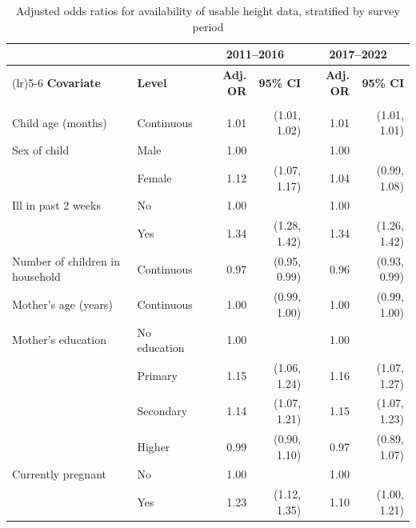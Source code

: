 \begin{table}[htbp]
\centering
\caption{Adjusted odds ratios for availability of usable height data, stratified by survey period}
\label{tab:time_stratified}
\begin{threeparttable}

\small
\renewcommand{\arraystretch}{1.15}
\setlength{\tabcolsep}{6pt}

\begin{tabularx}{\textwidth}{>{\raggedright\arraybackslash}Xlrrrr}
\toprule
& & \multicolumn{2}{c}{\textbf{2011--2016}} & \multicolumn{2}{c}{\textbf{2017--2022}} \\
\cmidrule(lr){3-4}\cmidrule(lr){5-6}
\textbf{Covariate} & \textbf{Level} &
\textbf{Adj. OR} & \textbf{95\% CI} &
\textbf{Adj. OR} & \textbf{95\% CI} \\
\midrule

\addlinespace[3pt]
\multicolumn{6}{l}{\textbf{Child characteristics}}\\
\addlinespace[2pt]

Child age (months) & Continuous & 1.01 & (1.01, 1.02) & 1.01 & (1.01, 1.01) \\

Sex of child & Male   & 1.00 &  & 1.00 &  \\
             & Female & 1.12 & (1.07, 1.17) & 1.04 & (0.99, 1.08) \\

Ill in past 2 weeks & No  & 1.00 &  & 1.00 &  \\
                   & Yes & 1.34 & (1.28, 1.42) & 1.34 & (1.26, 1.42) \\

Number of children in household & Continuous & 0.97 & (0.95, 0.99) & 0.96 & (0.93, 0.99) \\

Mother's age (years) & Continuous & 1.00 & (0.99, 1.00) & 1.00 & (0.99, 1.00) \\

Mother's education & No education & 1.00 &  & 1.00 &  \\
                  & Primary   & 1.15 & (1.06, 1.24) & 1.16 & (1.07, 1.27) \\
                  & Secondary & 1.14 & (1.07, 1.21) & 1.15 & (1.07, 1.23) \\
                  & Higher    & 0.99 & (0.90, 1.10) & 0.97 & (0.89, 1.07) \\

Currently pregnant & No  & 1.00 &  & 1.00 &  \\
                  & Yes & 1.23 & (1.12, 1.35) & 1.10 & (1.00, 1.21) \\


\end{tabularx}
\end{threeparttable}
\end{table}
